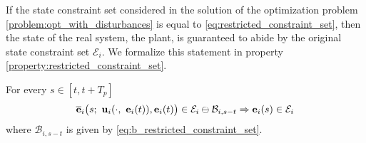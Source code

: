 If the state constraint set considered in the solution of the optimization
problem \eqref{problem:opt_with_disturbances} is equal to
\eqref{eq:restricted_constraint_set}, then the state of the real system,
the plant, is guaranteed to abide by the original state constraint set
$\mathcal{E}_i$. We formalize this statement in property
\eqref{property:restricted_constraint_set}.

\begin{bw_box}
  \begin{property}

  For every $s \in [t, t + T_p]$
  \begin{align}
    \overline{\bm{\mathbf{e}}}_i\big( s;\ \bm{\mathbf{u}}_i(\cdot,\ \bm{\mathbf{e}}_i(t)), \bm{\mathbf{e}}_i(t) \big) \in \mathcal{E}_i \ominus \mathcal{B}_{i,s-t}
    \Rightarrow
    \bm{\mathbf{e}}_i(s) \in \mathcal{E}_i
  \end{align}
  where $\mathcal{B}_{i,s-t}$ is given by \eqref{eq:b_restricted_constraint_set}.
\label{property:restricted_constraint_set}
\end{property}
\end{bw_box}

